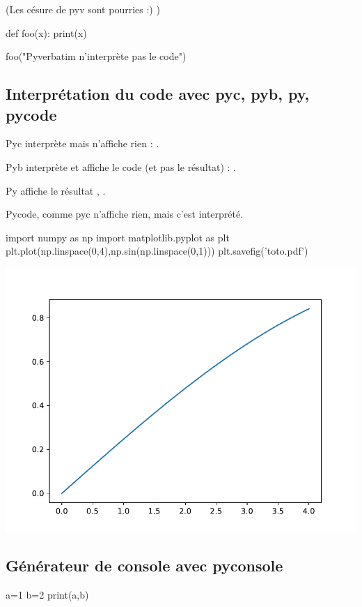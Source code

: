\documentclass[10pt,fleqn]{article} %
\begin{document}
(Les césure de pyv sont pourries :) )
\begin{pyverbatim}
def foo(x):
    print(x)

foo("Pyverbatim n'interprète pas le code")
\end{pyverbatim}

\subsection*{Interprétation du code avec pyc, pyb, py, pycode}

Pyc interprète mais n'affiche rien : .

Pyb interprète et affiche le code (et pas le résultat) : .

Py affiche le résultat , .

Pycode, comme pyc n'affiche rien, mais c'est interprété. 

\begin{pycode}
import numpy as np
import matplotlib.pyplot as plt
plt.plot(np.linspace(0,4),np.sin(np.linspace(0,1)))
plt.savefig('toto.pdf')
\end{pycode}

\includegraphics[width=.4\linewidth]{toto}

\subsection*{Générateur de console avec pyconsole}
\begin{pyconsole}
a=1
b=2
print(a,b)
\end{pyconsole}




\end{document}

